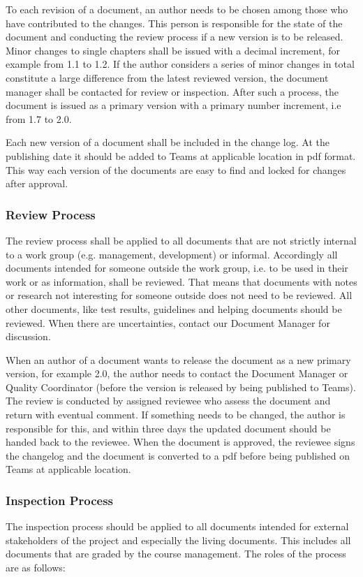 \documentclass{article}
\begin{document}
	To each revision of a document, an author needs to be chosen among those who have contributed to the changes. This person is responsible for the state of the document and conducting the review process if a new version is to be released. Minor changes to single chapters shall be issued with a decimal increment, for example from 1.1 to 1.2. If the author considers a series of minor changes in total constitute a large difference from the latest reviewed version, the document manager shall be contacted for review or inspection. After such a process, the document is issued as a primary version with a primary number increment, i.e from 1.7 to 2.0.  
	
	Each new version of a document shall be included in the change log. At the publishing date it should be added to Teams at applicable location in pdf format. This way each version of the documents are easy to find and locked for changes after approval.
	
	\subsubsection{Review Process}
	The review process shall be applied to all documents that are not strictly internal to a work group (e.g. management, development) or informal. Accordingly all documents intended for someone outside the work group, i.e. to be used in their work or as information, shall be reviewed. 
	That means that documents with notes or research not interesting for someone outside does not need to be reviewed. All other documents, like test results, guidelines and helping documents should be reviewed. When there are uncertainties, contact our Document Manager for discussion.
	
	When an author of a document wants to release the document as a new primary version, for example 2.0, the author needs to contact the Document Manager or Quality Coordinator (before the version is released by being published to Teams). The review is conducted by assigned reviewee who assess the document and return with eventual comment. If something needs to be changed, the author is responsible for this, and within three days the updated document should be handed back to the reviewee. When the document is approved, the reviewee signs the changelog and the document is converted to a pdf before being published on Teams at applicable location.
	
	\subsubsection{Inspection Process}
	The inspection process should be applied to all documents intended for external stakeholders of the project and especially the living documents. This includes all documents that are graded by the course management.
	The roles of the process are as follows:
	
\end{document}
